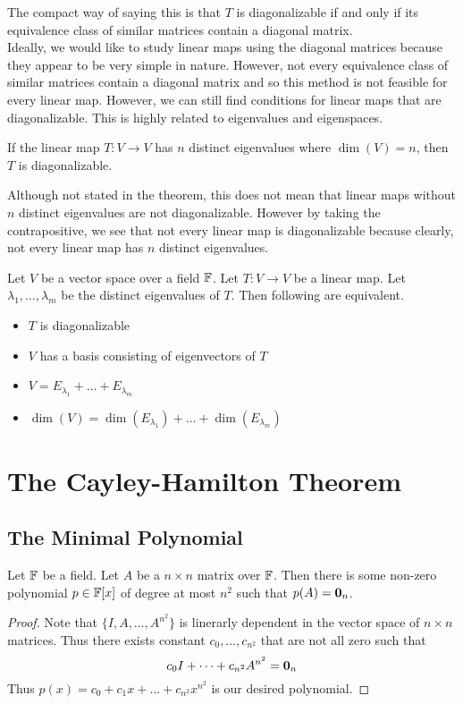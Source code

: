 \documentclass[a4paper]{article}
\begin{document}
The compact way of saying this is that $T$ is diagonalizable if and only if its equivalence class of similar matrices contain a diagonal matrix. \\

Ideally, we would like to study linear maps using the diagonal matrices because they appear to be very simple in nature. However, not every equivalence class of similar matrices contain a diagonal matrix and so this method is not feasible for every linear map. However, we can still find conditions for linear maps that are diagonalizable. This is highly related to eigenvalues and eigenspaces. 

\begin{thm}{}{} If the linear map $T:V\to V$ has $n$ distinct eigenvalues where $\dim(V)=n$, then $T$ is diagonalizable. 
\end{thm}

Although not stated in the theorem, this does not mean that linear maps without $n$ distinct eigenvalues are not diagonalizable. However by taking the contrapositive, we see that not every linear map is diagonalizable because clearly, not every linear map has $n$ distinct eigenvalues. 

\begin{thm}{}{} Let $V$ be a vector space over a field $\mathbb{F}$. Let $T:V\to V$ be a linear map. Let $\lambda_1,\dots,\lambda_m$ be the distinct eigenvalues of $T$. Then following are equivalent. 
\begin{itemize}
\item $T$ is diagonalizable
\item $V$ has a basis consisting of eigenvectors of $T$
\item $V=E_{\lambda_1}+\dots+E_{\lambda_m}$
\item $\dim(V)=\dim(E_{\lambda_1})+\dots+\dim(E_{\lambda_m})$
\end{itemize}
\end{thm}

\pagebreak
\section{The Cayley-Hamilton Theorem}
\subsection{The Minimal Polynomial}
\begin{thm}{}{} Let $\mathbb{F}$ be a field. Let $A$ be a $n\times n$ matrix over $\mathbb{F}$. Then there is some non-zero polynomial $p\in\mathbb{F}[x]$ of degree at most $n^2$ such that $p(A)=\vb{0}_n$. \begin{proof} Note that $\{I,A,\dots,A^{n^2}\}$ is linerarly dependent in the vector space of $n\times n$ matrices. Thus there exists constant $c_0,\dots,c_{n^2}$ that are not all zero such that $$c_0I+\dots+c_{n^2}A^{n^2}=\vb{0}_n$$ Thus $p(x)=c_0+c_1x+\dots+c_{n^2}x^{n^2}$ is our desired polynomial. 
\end{proof}
\end{thm}
\end{document}
